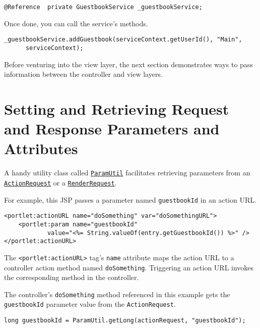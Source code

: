 \texttt{@Reference\ \ private\ GuestbookService\ \_guestbookService;}

Once done, you can call the service's methods.

\texttt{\_guestbookService.addGuestbook(serviceContext.getUserId(),\ "Main",\ \ \ \ \ \ \ \ \ \ serviceContext);}

\noindent\hrulefill

Before venturing into the view layer, the next section demonstrates ways
to pass information between the controller and view layers.

\section{Setting and Retrieving Request and Response Parameters and
Attributes}\label{setting-and-retrieving-request-and-response-parameters-and-attributes}

A handy utility class called
\href{https://docs.liferay.com/dxp/portal/7.2-latest/javadocs/portal-kernel/com/liferay/portal/kernel/util/ParamUtil.html}{\texttt{ParamUtil}}
facilitates retrieving parameters from an
\href{https://docs.liferay.com/portlet-api/3.0/javadocs/javax/portlet/ActionRequest.html}{\texttt{ActionRequest}}
or a
\href{https://docs.liferay.com/portlet-api/3.0/javadocs/javax/portlet/RenderRequest.html}{\texttt{RenderRequest}}.

For example, this JSP passes a parameter named \texttt{guestbookId} in
an action URL.

\begin{verbatim}
<portlet:actionURL name="doSomething" var="doSomethingURL">
    <portlet:param name="guestbookId" 
            value="<%= String.valueOf(entry.getGuestbookId()) %>" />
</portlet:actionURL>
\end{verbatim}

The \texttt{\textless{}portlet:actionURL\textgreater{}} tag's
\texttt{name} attribute maps the action URL to a controller action
method named \texttt{doSomething}. Triggering an action URL invokes the
corresponding method in the controller.

The controller's \texttt{doSomething} method referenced in this example
gets the \texttt{guestbookId} parameter value from the
\texttt{ActionRequest}.

\begin{verbatim}
long guestbookId = ParamUtil.getLong(actionRequest, "guestbookId");
\end{verbatim}

